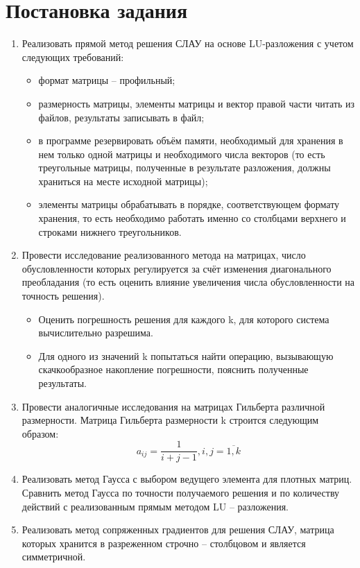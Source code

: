 \documentclass[a4paper,12pt]{article}
\begin{document}
\section{Постановка задания}
\begin{enumerate}
\item Реализовать прямой метод решения СЛАУ на основе LU-разложения с учетом следующих требований:
\begin{itemize}
\item формат матрицы – профильный;
\item размерность матрицы, элементы матрицы и вектор правой части читать из файлов, результаты записывать в файл;
\item в программе резервировать объём памяти, необходимый для хранения в нем только одной матрицы и необходимого числа векторов (то есть треугольные матрицы, полученные в результате разложения, должны храниться на месте исходной матрицы);
\item элементы матрицы обрабатывать в порядке, соответствующем формату хранения, то есть необходимо работать именно со столбцами верхнего и строками нижнего треугольников.
\end{itemize}

\item Провести исследование реализованного метода на матрицах, число
обусловленности которых регулируется за счёт изменения диагонального преобладания (то есть оценить влияние увеличения числа обусловленности на точность решения).
\begin{itemize}
\item Оценить погрешность решения для каждого k, для которого система вычислительно разрешима.
\item Для одного из значений k попытаться найти операцию, вызывающую скачкообразное накопление погрешности, пояснить полученные результаты.
\end{itemize}

\item Провести аналогичные исследования на матрицах Гильберта различной размерности. Матрица Гильберта размерности k строится следующим образом:
\begin{equation*}
    a_{ij} = \frac{1}{i + j - 1}, i,j = \overline{1,k}
\end{equation*}

\item Реализовать метод Гаусса с выбором ведущего элемента для плотных матриц. Сравнить метод Гаусса по точности получаемого решения и по количеству действий с реализованным прямым методом LU – разложения.

\item Реализовать метод сопряженных градиентов для решения СЛАУ, матрица которых хранится в разреженном строчно – столбцовом и является симметричной.

\end{enumerate}
\end{document}
